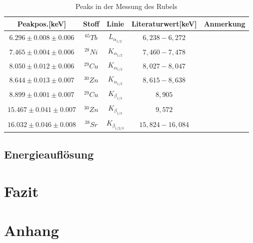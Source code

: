 \documentclass[12pt,a4paper]{article}
\begin{document}
\begin{table}[H]
\center
\begin{tabular}{|c|c|c|c|c|}
\hline 
Peakpos.[keV] & Stoff & Linie & Literaturwert[keV] & Anmerkung \\
\hline 
$6.296 \pm 0.008 \pm 0.006$& $^{65}Tb$ & $L_{\alpha_{1/2}}$ & $6,238-6,272$ & \\
\hline 
$7.465 \pm 0.004 \pm 0.006$ & $^{28}Ni$ & $K_{\alpha_{1/2}}$ & $7,460-7,478$ & \\
\hline
$8.050 \pm 0.012 \pm 0.006$ & $^{29}Cu$ & $K_{\alpha_{1/2}}$ & $8,027-8,047$ & \\
\hline
$8.644 \pm 0.013 \pm 0.007$ & $^{30}Zn$ & $K_{\alpha_{1/2}}$ & $8,615-8,638$ & \\
\hline
$8.899 \pm 0.001 \pm 0.007$ & $^{29}Cu$ & $K_{\beta_{1/3}}$ & $8,905$ & \\
\hline
$15.467 \pm 0.041 \pm 0.007$ & $^{30}Zn$ & $K_{\beta_{1/3}}$ & $9,572$ & \\
\hline
$16.032 \pm 0.046 \pm 0.008$ & $^{38}Sr$ & $K_{\beta_{1/2/3}}$ & $15,824-16,084$ & \\
\hline
\end{tabular} 
\caption{Peaks in der Messung des Rubels}
\label{prop_rubel}
\end{table}
\subsection{Energieauflösung}

\section{Fazit}
\section{Anhang}
\end{document}
